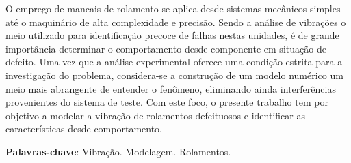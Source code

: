 \imprimircapa
\imprimirfolhaderosto
\clearpage


%	

\begin{resumo}
	\SingleSpacing
	O emprego de mancais de rolamento se aplica desde sistemas mecânicos simples até o maquinário de alta complexidade e precisão.
	Sendo a análise de vibrações o meio utilizado para identificação precoce de falhas nestas unidades, é de grande importância determinar o comportamento desde componente em situação de defeito.
	Uma vez que a análise experimental oferece uma condição estrita para a investigação do problema, considera-se a construção de um modelo numérico um meio mais abrangente de entender o fenômeno, eliminando ainda interferências provenientes do sistema de teste.
	Com este foco, o presente trabalho tem por objetivo a modelar a vibração de rolamentos defeituosos e identificar as características desde comportamento.
	\vspace{\onelineskip}
	
	\noindent
	\textbf{Palavras-chave}: Vibração. Modelagem. Rolamentos.
\end{resumo}

%		

\listoffigures*
\cleardoublepage

\listofquadros*
\cleardoublepage


\listofsiglas*
\cleardoublepage

\listofsimbolos*
\cleardoublepage

\tableofcontents*
\cleardoublepage
